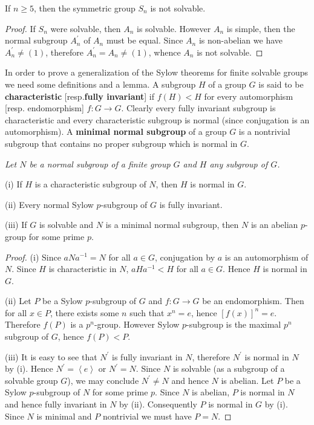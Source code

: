 \begin{corollary}
If $n\ge 5$, then the symmetric group $S_n$ is not solvable.
\end{corollary}
\begin{proof}
If $S_n$ were solvable, then $A_n$ is solvable. However $A_n$ is simple, then the normal subgroup $A_n^\prime$ of $A_n$ must be equal. Since $A_n$ is non-abelian we have $A_n^\prime\ne(1)$, therefore $A_n^\prime=A_n\ne(1)$, whence $A_n$ is not solvable.
\end{proof}
In order to prove a generalization of the Sylow theorems for finite solvable groups we need some definitions and a lemma. A subgroup $H$ of a group $G$ is said to be \textbf{characteristic} [resp.\textbf{fully invariant}] if $f(H)<H$ for every automorphism [resp. endomorphism] $f:G\to G$. Clearly every fully invariant subgroup is characteristic and every characteristic subgroup is normal (since conjugation is an automorphism). A \textbf{minimal normal subgroup} of a group $G$ is a nontrivial subgroup that contains no proper subgroup which is normal in $G$.
\begin{lemma}\em
Let $N$ be a normal subgroup of a finite group $G$ and $H$ any subgroup of $G$.\par
(i) If $H$ is a characteristic subgroup of $N$, then $H$ is normal in $G$.\par
(ii) Every normal Sylow $p$-subgroup of $G$ is fully invariant.\par
(iii) If $G$ is solvable and $N$ is a minimal normal subgroup, then $N$ is an abelian $p$-group for some prime $p$.
\end{lemma}
\begin{proof}
(i) Since $aNa^{-1}=N$ for all $a\in G$, conjugation by $a$ is an automorphism of $N$. Since $H$ is characteristic in $N$, $aHa^{-1}<H$ for all $a\in G$. Hence $H$ is normal in $G$.\par
(ii) Let $P$ be a Sylow $p$-subgroup of $G$ and $f:G\to G$ be an endomorphism. Then for all $x\in P$, there exists some $n$ such that $x^n=e$, hence $[f(x)]^n=e$. Therefore $f(P)$ is a $p^n$-group. However Sylow $p$-subgroup is the maximal $p^n$ subgroup of $G$, hence $f(P)<P$.\par
(iii) It is easy to see that $N^\prime$ is fully invariant in $N$, therefore $N^\prime$ is normal in $N$ by (i). Hence $N^\prime=\left<e\right>$ or $N^\prime=N$. Since $N$ is solvable (as a subgroup of a solvable group $G$), we may conclude $N^\prime\ne N$ and hence $N$ is abelian. Let $P$ be a Sylow $p$-subgroup of $N$ for some prime $p$. Since $N$ is abelian, $P$ is normal in $N$ and hence fully invariant in $N$ by (ii). Consequently $P$ is normal in $G$ by (i). Since $N$ is minimal and $P$ nontrivial we must have $P=N$.
\end{proof}
